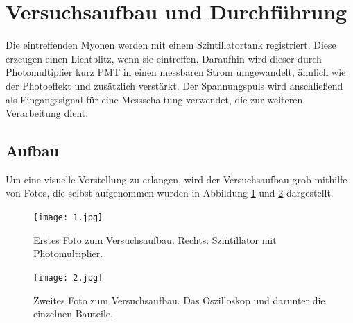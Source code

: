 \section{Versuchsaufbau und Durchführung}
\label{sec:Aufbau}

Die eintreffenden Myonen werden mit einem Szintillatortank registriert. Diese erzeugen einen Lichtblitz, wenn sie eintreffen. Daraufhin wird dieser durch Photomultiplier kurz PMT in einen messbaren Strom umgewandelt, ähnlich wie der Photoeffekt und zusätzlich verstärkt. Der Spannungspuls wird anschließend als Eingangssignal für eine Messschaltung verwendet, die zur weiteren Verarbeitung dient.

\subsection{Aufbau}
Um eine visuelle Vorstellung zu erlangen, wird der Versuchsaufbau grob mithilfe von Fotos, die selbst aufgenommen wurden in Abbildung \ref{fig:1} und \ref{fig:2} dargestellt.\newline 

\begin{figure}[H]
\centering
\texttt{[image: 1.jpg]}
\caption{Erstes Foto zum Versuchsaufbau. Rechts: Szintillator mit Photomultiplier.}
\label{fig:1}
\end{figure}

\begin{figure}[H]
\centering
\texttt{[image: 2.jpg]}
\caption{Zweites Foto zum Versuchsaufbau. Das Oszilloskop und darunter die einzelnen Bauteile.}
\label{fig:2}
\end{figure}

